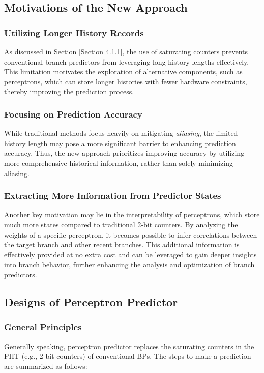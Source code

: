 \documentclass{article}
\begin{document}
\subsection{Motivations of the New Approach}

\subsubsection{Utilizing Longer History Records}
As discussed in Section \ref{Section 4.1.1}, the use of saturating counters prevents conventional branch predictors from leveraging long history lengths effectively. This limitation motivates the exploration of alternative components, such as perceptrons, which can store longer histories with fewer hardware constraints, thereby improving the prediction process.

\subsubsection{Focusing on Prediction Accuracy}
While traditional methods focus heavily on mitigating \textit{aliasing}, the limited history length may pose a more significant barrier to enhancing prediction accuracy. Thus, the new approach prioritizes improving accuracy by utilizing more comprehensive historical information, rather than solely minimizing aliasing.

\subsubsection{Extracting More Information from Predictor States}
Another key motivation may lie in the interpretability of perceptrons, which store much more states compared to traditional 2-bit counters. By analyzing the weights of a specific perceptron, it becomes possible to infer correlations between the target branch and other recent branches. This additional information is effectively provided at no extra cost and can be leveraged to gain deeper insights into branch behavior, further enhancing the analysis and optimization of branch predictors.

\subsection{Designs of Perceptron Predictor}
\subsubsection{General Principles}
Generally speaking, perceptron predictor replaces the saturating counters in the PHT (e.g., 2-bit counters) of conventional BPs. The steps to make a prediction are summarized as follows:
\end{document}
